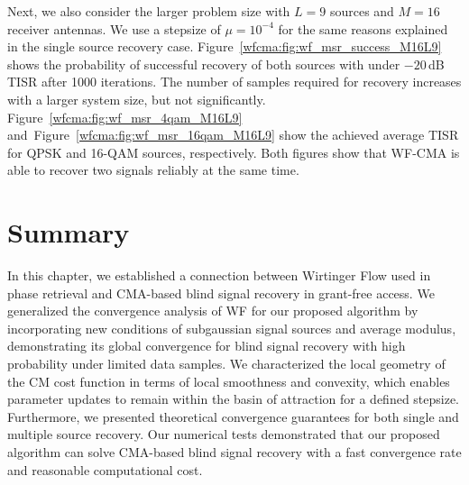 Next, we also consider the larger problem size with $L=9$ sources and $M=16$ receiver antennas. 
We use a stepsize of $\mu=10^{-4}$ for the same reasons explained in the single source recovery case. 
Figure~\ref{wfcma:fig:wf_msr_success_M16L9} shows the probability of successful recovery of both sources with
under $-20\,$dB TISR after 1000 iterations. The number of samples required for recovery increases with a larger system size, but not significantly. 
Figure~\ref{wfcma:fig:wf_msr_4qam_M16L9} and~Figure~\ref{wfcma:fig:wf_msr_16qam_M16L9} show the achieved average TISR for QPSK and 16-QAM sources, respectively. 
Both figures show that WF-CMA is able to recover two signals reliably at the same time.


\section{Summary}
In this chapter, we established a connection between Wirtinger Flow used in phase retrieval and CMA-based blind signal recovery in grant-free access. 
We generalized the convergence analysis of WF for our proposed algorithm by incorporating new conditions of subgaussian signal sources and average modulus, demonstrating its global convergence for blind signal recovery with high probability under limited data samples. 
We characterized the local geometry of the CM cost function in terms of local smoothness and convexity, which enables parameter updates to remain within the basin of attraction for a defined stepsize. Furthermore, we presented theoretical convergence guarantees for both single and multiple source recovery.
Our numerical tests demonstrated that our proposed algorithm can solve CMA-based blind signal recovery with a fast convergence rate and reasonable computational cost. 